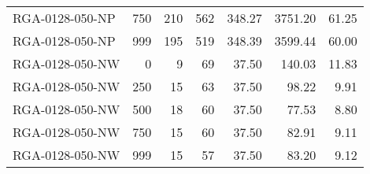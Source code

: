 \begin{table}[htbp]
{\begin{tabular}{lrrrrrr}
    RGA-0128-050-NP & 750    & 210    & 562    & 348.27 & 3751.20 & 61.25 \\
    RGA-0128-050-NP & 999    & 195    & 519    & 348.39 & 3599.44 & 60.00 \\ \hline
    RGA-0128-050-NW & 0      & 9      & 69     & 37.50  & 140.03 & 11.83 \\
    RGA-0128-050-NW & 250    & 15     & 63     & 37.50  & 98.22  & 9.91 \\
    RGA-0128-050-NW & 500    & 18     & 60     & 37.50  & 77.53  & 8.80 \\
    RGA-0128-050-NW & 750    & 15     & 60     & 37.50  & 82.91  & 9.11 \\
    RGA-0128-050-NW & 999    & 15     & 57     & 37.50  & 83.20  & 9.12 \\
    \bottomrule
    \end{tabular}}
  \label{tab:addlabel}%
\end{table}%
